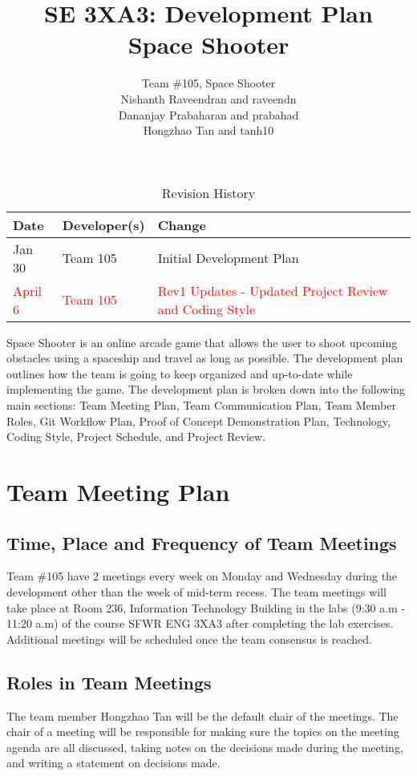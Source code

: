 \documentclass{article}
\title{SE 3XA3: Development Plan\\Space Shooter}
\author{Team \#105, Space Shooter
		\\ Nishanth Raveendran and raveendn
		\\ Dananjay Prabaharan and prabahad
		\\ Hongzhao Tan and tanh10
}
\date{}
\begin{document}
\begin{table}[hp]
\caption{Revision History} \label{TblRevisionHistory}
\begin{tabularx}{\textwidth}{llX}
\toprule
\textbf{Date} & \textbf{Developer(s)} & \textbf{Change}\\
\midrule
Jan 30 & Team 105  & Initial Development Plan\\
\textcolor{red}{April 6} & \textcolor{red}{Team 105} & \textcolor{red}{Rev1 Updates - Updated Project Review and Coding Style}\\
\bottomrule
\end{tabularx}
\end{table}

\newpage

\maketitle

Space Shooter is an online arcade game that allows the user to shoot upcoming obstacles using a spaceship and travel as long as possible. The development plan outlines how the team is going to keep organized and up-to-date while implementing the game. The development plan is broken down into the following main sections: Team Meeting Plan, Team Communication Plan, Team Member Roles, Git Workflow Plan, Proof of Concept Demonstration Plan, Technology, Coding Style, Project Schedule, and Project Review. 

\section{Team Meeting Plan}

\subsection{Time, Place and Frequency of Team Meetings}
Team \#105 have 2 meetings every week on Monday and Wednesday during the development other than the week of mid-term recess. The team meetings will take place at Room 236, Information Technology Building in the labs (9:30 a.m - 11:20 a.m) of the course SFWR ENG 3XA3 after completing the lab exercises. Additional meetings will be scheduled once the team consensus is reached.
\subsection{Roles in Team Meetings}
The team member Hongzhao Tan will be the default chair of the meetings. The chair of a meeting will be responsible for making sure the topics on the meeting agenda are all discussed, taking notes on the decisions made during the meeting, and writing a statement on decisions made. 
\end{document}
